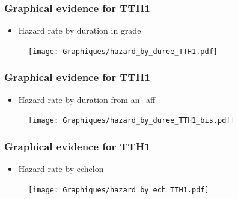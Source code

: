 \documentclass[xcolor=table,ignorenonframetext,12pt]{beamer}
\begin{document}
\begin{frame}
\frametitle{Graphical evidence for TTH1}
\begin{itemize}
	\item Hazard rate by duration in grade
\end{itemize}
\vspace{-0.2cm}
\begin{center}
\begin{figure}
\texttt{[image: Graphiques/hazard\_by\_duree\_TTH1.pdf]}
\end{figure}
\end{center}
\end{frame}

\begin{frame}
\frametitle{Graphical evidence for TTH1}
\begin{itemize}
	\item Hazard rate by duration from an\_aff
\end{itemize}
\vspace{-0.2cm}
\begin{center}
\begin{figure}
\texttt{[image: Graphiques/hazard\_by\_duree\_TTH1\_bis.pdf]}
\end{figure}
\end{center}
\end{frame}



\begin{frame}
\frametitle{Graphical evidence for TTH1}
\begin{itemize}
	\item Hazard rate by echelon
\end{itemize}
\vspace{-0.2cm}
\begin{center}
\begin{figure}
\texttt{[image: Graphiques/hazard\_by\_ech\_TTH1.pdf]}
\end{figure}
\end{center}
\end{frame}
\end{document}
